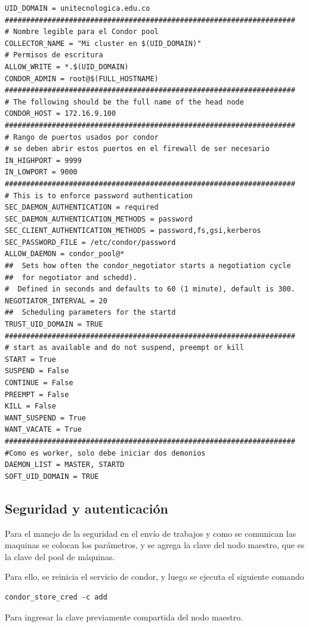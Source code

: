 \begin{lstlisting}
UID_DOMAIN = unitecnologica.edu.co
####################################################################
# Nombre legible para el Condor pool
COLLECTOR_NAME = "Mi cluster en $(UID_DOMAIN)"
# Permisos de escritura
ALLOW_WRITE = *.$(UID_DOMAIN)
CONDOR_ADMIN = root@$(FULL_HOSTNAME)
####################################################################
# The following should be the full name of the head node
CONDOR_HOST = 172.16.9.100
####################################################################
# Rango de puertos usados por condor 
# se deben abrir estos puertos en el firewall de ser necesario
IN_HIGHPORT = 9999
IN_LOWPORT = 9000
####################################################################
# This is to enforce password authentication
SEC_DAEMON_AUTHENTICATION = required
SEC_DAEMON_AUTHENTICATION_METHODS = password
SEC_CLIENT_AUTHENTICATION_METHODS = password,fs,gsi,kerberos
SEC_PASSWORD_FILE = /etc/condor/password
ALLOW_DAEMON = condor_pool@*
##  Sets how often the condor_negotiator starts a negotiation cycle
##  for negotiator and schedd).
#  Defined in seconds and defaults to 60 (1 minute), default is 300.
NEGOTIATOR_INTERVAL = 20
##  Scheduling parameters for the startd
TRUST_UID_DOMAIN = TRUE
####################################################################
# start as available and do not suspend, preempt or kill
START = True
SUSPEND = False
CONTINUE = False
PREEMPT = False
KILL = False
WANT_SUSPEND = True
WANT_VACATE = True
####################################################################
#Como es worker, solo debe iniciar dos demonios
DAEMON_LIST = MASTER, STARTD
SOFT_UID_DOMAIN = TRUE
\end{lstlisting} 


\subsection{Seguridad y autenticación}
Para el manejo de la seguridad en el envío de trabajos y como se comunican las maquinas se colocan los  parámetros, y se agrega la clave del nodo maestro, que es la clave del pool de máquinas.

Para ello, se reinicia el servicio de condor, y luego se ejecuta el siguiente comando

\begin{lstlisting}
condor_store_cred -c add
\end{lstlisting}
Para ingresar la clave previamente compartida del nodo maestro. 

